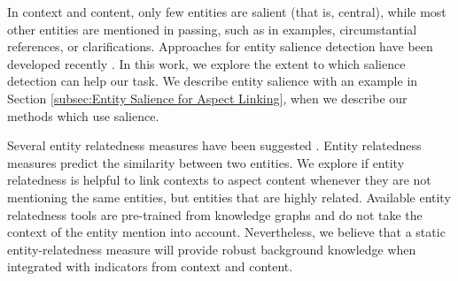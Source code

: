 In context and content, only few entities are salient (that is, central), while most other entities are mentioned in passing, such as in examples, circumstantial references, or clarifications. Approaches for entity salience detection have been developed  recently \cite{dunietz-gillick-2014-new, xiong2018towards, swat}. %
In this work, we explore the extent to which salience detection can help our task. We describe entity salience with an example in Section \ref{subsec:Entity Salience for Aspect Linking}, when we describe our methods which use salience.

Several entity relatedness measures have been suggested \cite{ristoski2016rdf2vec, ruback2018computing, zeng2019measuring, ponza2017two}. Entity relatedness measures predict the similarity between two entities. We explore if entity relatedness is helpful to link contexts to aspect content whenever they are not mentioning the same entities, but entities that are highly related.
Available entity relatedness tools \cite{piccinno2014wat} are pre-trained from knowledge graphs and do not take the context of the entity mention into account. Nevertheless, we believe that a static entity-relatedness measure will provide robust background knowledge when integrated with indicators from context and content.

 
